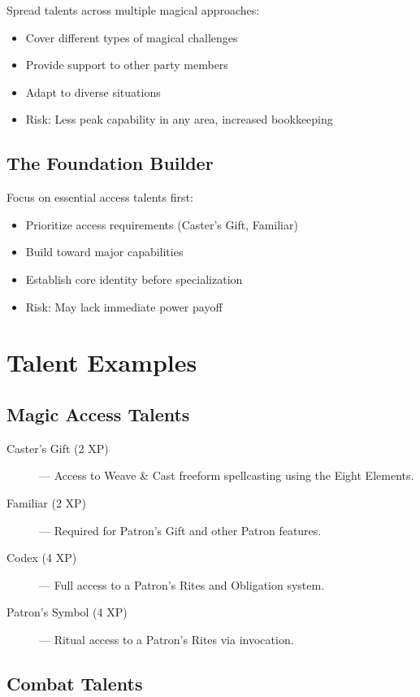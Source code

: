 \documentclass[11pt,twoside,openany]{book}
\begin{document}
Spread talents across multiple magical approaches:
\begin{itemize}
\item Cover different types of magical challenges
\item Provide support to other party members
\item Adapt to diverse situations
\item Risk: Less peak capability in any area, increased bookkeeping
\end{itemize}

\subsection*{The Foundation Builder}

Focus on essential access talents first:
\begin{itemize}
\item Prioritize access requirements (Caster's Gift, Familiar)
\item Build toward major capabilities
\item Establish core identity before specialization
\item Risk: May lack immediate power payoff
\end{itemize}

\section*{Talent Examples} 

\subsection*{Magic Access Talents}

\begin{description}
\item[Caster's Gift (2 XP)] — Access to Weave \& Cast freeform spellcasting using the Eight Elements.
\item[Familiar (2 XP)] — Required for Patron's Gift and other Patron features.
\item[Codex (4 XP)] — Full access to a Patron's Rites and Obligation system.
\item[Patron's Symbol (4 XP)] — Ritual access to a Patron's Rites via invocation.
\end{description}

\subsection*{Combat Talents}
\end{document}
